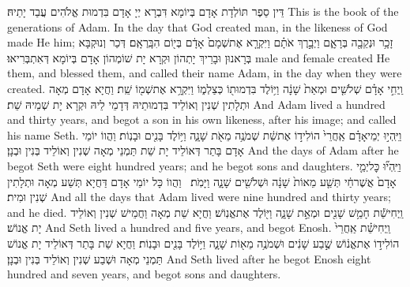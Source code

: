 {דֵּין סֵפֶר תּוֹלְדָת אָדָם בְּיוֹמָא דִּבְרָא יְיָ אָדָם בִּדְמוּת אֱלֹהִים עֲבַד יָתֵיהּ׃}
{This is the book of the generations of Adam. In the day that God created man, in the likeness of God made He him;}{}
{זָכָ֥ר וּנְקֵבָ֖ה בְּרָאָ֑ם וַיְבָ֣רֶךְ אֹתָ֗ם וַיִּקְרָ֤א אֶת\maqqaf שְׁמָם֙ אָדָ֔ם בְּי֖וֹם הִבָּֽרְאָֽם׃}
{דְּכַר וְנוּקְבָּא בְּרָאנוּן וּבָרֵיךְ יָתְהוֹן וּקְרָא יָת שׁוֹמְהוֹן אָדָם בְּיוֹמָא דְּאִתְבְּרִיאוּ׃}
{male and female created He them, and blessed them, and called their name Adam, in the day when they were created.}{}
{וַֽיְחִ֣י אָדָ֗ם שְׁלֹשִׁ֤ים וּמְאַת֙ שָׁנָ֔ה וַיּ֥וֹלֶד בִּדְמוּת֖וֹ כְּצַלְמ֑וֹ וַיִּקְרָ֥א אֶת\maqqaf שְׁמ֖וֹ שֵֽׁת׃}
{וַחֲיָא אָדָם מְאָה וּתְלָתִין שְׁנִין וְאוֹלֵיד בִּדְמוּתֵיהּ דְּדָמֵי לֵיהּ וּקְרָא יָת שְׁמֵיהּ שֵׁת׃}
{And Adam lived a hundred and thirty years, and begot a son in his own likeness, after his image; and called his name Seth.}{}
{וַיִּֽהְי֣וּ יְמֵי\maqqaf אָדָ֗ם אַֽחֲרֵי֙ הוֹלִיד֣וֹ אֶת\maqqaf שֵׁ֔ת שְׁמֹנֶ֥ה מֵאֹ֖ת שָׁנָ֑ה וַיּ֥וֹלֶד בָּנִ֖ים וּבָנֽוֹת׃}
{וַהֲווֹ יוֹמֵי אָדָם בָּתַר דְּאוֹלֵיד יָת שֵׁת תַּמְנֵי מְאָה שְׁנִין וְאוֹלֵיד בְּנִין וּבְנָן׃}
{And the days of Adam after he begot Seth were eight hundred years; and he begot sons and daughters.}{}
{וַיִּֽהְי֞וּ כׇּל\maqqaf יְמֵ֤י אָדָם֙ אֲשֶׁר\maqqaf חַ֔י תְּשַׁ֤ע מֵאוֹת֙ שָׁנָ֔ה וּשְׁלֹשִׁ֖ים שָׁנָ֑ה וַיָּמֹֽת׃ \setuma }
{וַהֲווֹ כָּל יוֹמֵי אָדָם דַּחֲיָא תְּשַׁע מְאָה וּתְלָתִין שְׁנִין וּמִית׃}
{And all the days that Adam lived were nine hundred and thirty years; and he died.}{}
{וַֽיְחִי\maqqaf שֵׁ֕ת חָמֵ֥שׁ שָׁנִ֖ים וּמְאַ֣ת שָׁנָ֑ה וַיּ֖וֹלֶד אֶת\maqqaf אֱנֽוֹשׁ׃}
{וַחֲיָא שֵׁת מְאָה וַחֲמֵישׁ שְׁנִין וְאוֹלֵיד יָת אֱנוֹשׁ׃}
{And Seth lived a hundred and five years, and begot Enosh.}{}
{וַֽיְחִי\maqqaf שֵׁ֗ת אַֽחֲרֵי֙ הוֹלִיד֣וֹ אֶת\maqqaf אֱנ֔וֹשׁ שֶׁ֣בַע שָׁנִ֔ים וּשְׁמֹנֶ֥ה מֵא֖וֹת שָׁנָ֑ה וַיּ֥וֹלֶד בָּנִ֖ים וּבָנֽוֹת׃}
{וַחֲיָא שֵׁת בָּתַר דְּאוֹלֵיד יָת אֱנוֹשׁ תַּמְנֵי מְאָה וּשְׁבַע שְׁנִין וְאוֹלֵיד בְּנִין וּבְנָן׃}
{And Seth lived after he begot Enosh eight hundred and seven years, and begot sons and daughters.}{}
